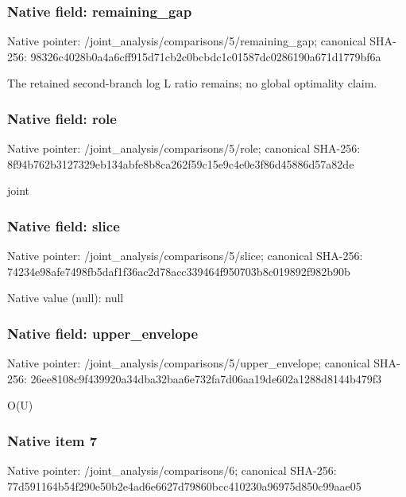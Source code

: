\documentclass[10pt,a4paper]{article}
\begin{document}
\subsubsection{Native field: remaining\_\allowbreak{}gap}
Native pointer: /joint\_\allowbreak{}analysis/comparisons/5/remaining\_\allowbreak{}gap; canonical SHA-256: 98326c4028b0a4a6cff915d71cb2c0bcbdc1c01587dc0286190a671d1779bf6a

\begingroup\raggedright\sloppy The retained second-branch log L ratio remains;\allowbreak{} no global optimality claim.\par\endgroup

\subsubsection{Native field: role}
Native pointer: /joint\_\allowbreak{}analysis/comparisons/5/role; canonical SHA-256: 8f94b762b3127329eb134abfe8b8ca262f59c15e9c4e0e3f86d45886d57a82de

\begingroup\raggedright\sloppy joint\par\endgroup

\subsubsection{Native field: slice}
Native pointer: /joint\_\allowbreak{}analysis/comparisons/5/slice; canonical SHA-256: 74234e98afe7498fb5daf1f36ac2d78acc339464f950703b8c019892f982b90b

Native value (null): null

\subsubsection{Native field: upper\_\allowbreak{}envelope}
Native pointer: /joint\_\allowbreak{}analysis/comparisons/5/upper\_\allowbreak{}envelope; canonical SHA-256: 26ee8108c9f439920a34dba32baa6e732fa7d06aa19de602a1288d8144b479f3

\begingroup\raggedright\sloppy O(U)\par\endgroup

\subsubsection{Native item 7}
Native pointer: /joint\_\allowbreak{}analysis/comparisons/6; canonical SHA-256: 77d591164b54f290e50b2e4ad6e6627d79860bcc410230a96975d850c99aae05
\end{document}
